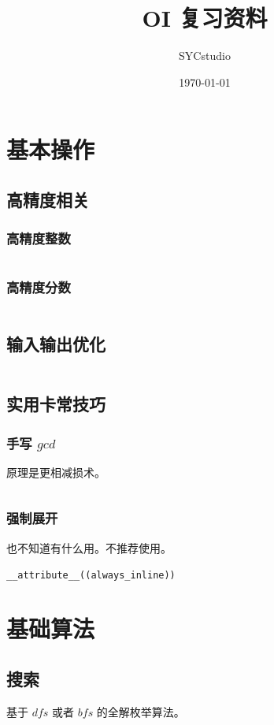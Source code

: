 \documentclass[UTF-8]{ctexart}
\title{OI 复习资料}
\author{SYCstudio}
\date{\today}
\newcommand{\cpp}[1]{\inputminted[bgcolor=bg,breaklines,breakanywhere=true]{c++}{#1}}
\begin{document}
	\maketitle%
	\newpage
	\tableofcontents%
	\newpage%
	\section{基本操作}
		\subsection{高精度相关}
			\subsubsection{高精度整数}
			\cpp{code//Basic//biginteger.cpp}
			\subsubsection{高精度分数}
			\cpp{code//Basic//bigfraction.cpp}
		\subsection{输入输出优化}
		\cpp{code//Basic//io.cpp}
		\subsection{实用卡常技巧}
			\subsubsection{手写 $gcd$}
			原理是更相减损术。
			\cpp{code//Basic//fastgcd.cpp}
			\subsubsection{强制展开}
			也不知道有什么用。不推荐使用。

			\texttt{__attribute__((always_inline))}
	\newpage
	\section{基础算法}
		\subsection{搜索}
		基于 $dfs$ 或者 $bfs$ 的全解枚举算法。
\end{document}
